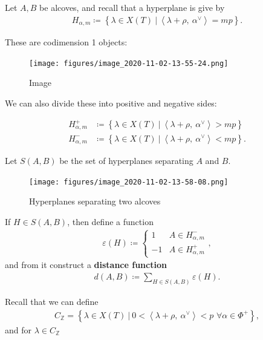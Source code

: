 Let \(A, B\) be alcoves, and recall that a hyperplane is give by
\begin{align*}  
H_{\alpha, m} \coloneqq\left\{{ \lambda \in X(T) {~\mathrel{\Big|}~}{\left\langle {\lambda + \rho},~{\alpha^\vee} \right\rangle} = mp }\right\}
.\end{align*}

These are codimension 1 objects:

\begin{figure}
\centering
\texttt{[image: figures/image\_2020-11-02-13-55-24.png]}
\caption{Image}
\end{figure}

We can also divide these into positive and negative sides:

\begin{align*}  
H_{\alpha, m}^+ &\coloneqq\left\{{   \lambda \in X(T) {~\mathrel{\Big|}~}{\left\langle {\lambda + \rho},~{\alpha^\vee} \right\rangle} > mp }\right\} \\
H_{\alpha, m}^- &\coloneqq\left\{{   \lambda \in X(T) {~\mathrel{\Big|}~}{\left\langle {\lambda + \rho},~{\alpha^\vee} \right\rangle} < mp }\right\} 
.\end{align*}

Let \(S(A, B)\) be the set of hyperplanes separating \(A\) and \(B\).

\begin{figure}
\centering
\texttt{[image: figures/image\_2020-11-02-13-58-08.png]}
\caption{Hyperplanes separating two alcoves}
\end{figure}

If \(H\in S(A, B)\), then define a function
\begin{align*}  
\varepsilon(H) \coloneqq
\begin{cases}
1 & A\in H_{\alpha, m}^- \\
-1 & A\in H_{\alpha, m}^+
\end{cases}
,\end{align*}
and from it construct a \textbf{distance function}
\begin{align*}  
d(A, B) \coloneqq\sum_{H\in S(A, B)} \varepsilon(H)
.\end{align*}

Recall that we can define
\begin{align*}  
C_{\mathbb{Z}}= \left\{{\lambda \in X(T) {~\mathrel{\Big|}~}0 < {\left\langle {\lambda+\rho},~{\alpha^\vee} \right\rangle}<p \,\, \forall \alpha\in\Phi^+ }\right\}
,\end{align*}
and for \(\lambda \in C_{\mathbb{Z}}\)

